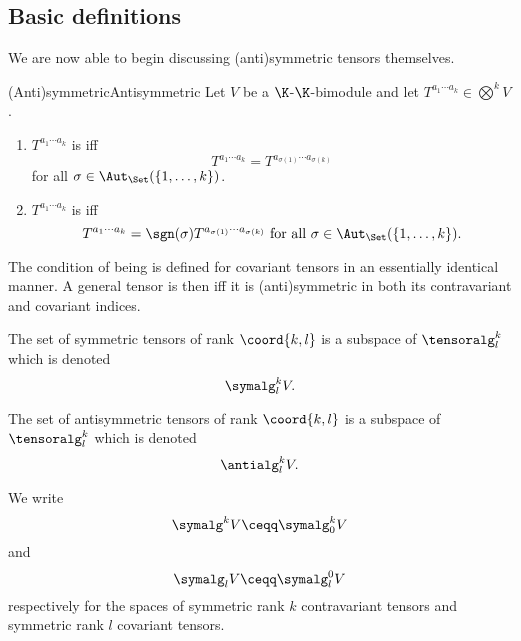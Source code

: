 \subsection{Basic definitions}

We are now able to begin discussing (anti)symmetric tensors themselves.
\begin{dfn}{(Anti)symmetric}{Antisymmetric}
	Let $V$ be a $\K$-$\K$-bimodule and let $T^{a_1\cdots a_k}\in \bigotimes ^kV$.
	\begin{enumerate}
		\item $T^{a_1\cdots a_k}$ is  iff
		\begin{equation}
			T^{a_1\cdots a_k}=T^{a_{\sigma (1)}\cdots a_{\sigma (k)}}
		\end{equation}
		for all $\sigma \in \Aut _{\Set}(\{ 1,\ldots ,k\} )$.
		\item $T^{a_1\cdots a_k}$ is  iff
		\begin{equation}
			T^{a_1\cdots a_k}=\sgn (\sigma )T^{a_{\sigma (1)}\cdots a_{\sigma (k)}}$ for all $\sigma \in \Aut _{\Set}(\{ 1,\ldots ,k\}).
		\end{equation}
	\end{enumerate}
	\begin{rmk}
		The condition of being  is defined for covariant tensors in an essentially identical manner.  A general tensor is then  iff it is (anti)symmetric in both its contravariant and covariant indices.
	\end{rmk}
	\begin{rmk}
		The set of symmetric tensors of rank $\coord{k,l}$ is a subspace of $\tensoralg _l^k$ which is denoted
		\begin{equation}
			\symalg _l^kV.
		\end{equation}\index[notation]{$\symalg _l^kV$}
		
		The set of antisymmetric tensors of rank $\coord{k,l}$ is a subspace of $\tensoralg _l^k$ which is denoted
		\begin{equation}
		\antialg _l^kV.
		\end{equation}\index[notation]{$\antialg _l^kV$}
	\end{rmk}
	\begin{rmk}
		We write
		\begin{equation}
			\symalg ^kV\ceqq \symalg _0^kV
		\end{equation}\index[notation]{$\symalg ^kV$}
		and
		\begin{equation}
			\symalg _lV\ceqq \symalg _l^0V
		\end{equation}\index[notation]{$\symalg _lV$}
		respectively for the spaces of symmetric rank $k$ contravariant tensors and symmetric rank $l$ covariant tensors.
		

\end{rmk}
\end{dfn}

